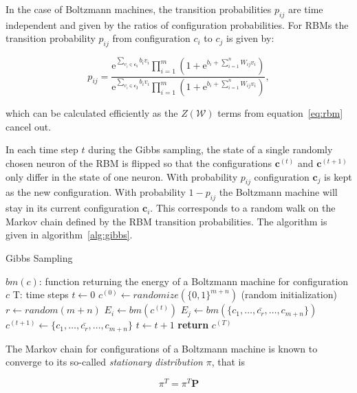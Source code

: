 In the case of Boltzmann machines, the transition probabilities $p_{ij}$ are time independent and 
given by the ratios of configuration probabilities. For RBMs the transition probability $p_{ij}$ 
from configuration $c_i$ to $c_j$ is given by:

\begin{equation}
    p_{ij} = \frac{\mathrm{e}^{\sum_{v_i \in \bm{c_i}}b_iv_i}\prod_{i=1}^m(1+\mathrm{e}^{b_i + \sum_{i=1}^nW_{ij}v_i})}{\mathrm{e}^{\sum_{v_i \in \bm{c_j}}b_iv_i}\prod_{i=1}^m(1+\mathrm{e}^{b_i + \sum_{i=1}^nW_{ij}v_i})},
\end{equation}

which can be calculated efficiently as the $Z(\mathcal{W})$ terms from equation~\ref{eq:rbm} cancel out.

In each time step $t$ during the Gibbs sampling, the state of a single randomly chosen neuron of the RBM is flipped
so that the configurations $\bm{c}^{(t)}$ and $\bm{c}^{(t+1)}$ only differ in the state of one neuron. With 
probability $p_{ij}$ configuration $\bm{c}_j$ is kept as the new configuration. With probability
$1-p_{ij}$ the Boltzmann machine will stay in its current configuration $\bm{c}_i$. This corresponds to a random walk on the Markov chain defined by the RBM transition probabilities. The algorithm is given in 
algorithm~\ref{alg:gibbs}.

\begin{algorithm}[H]
    \caption{Gibbs Sampling}
    \begin{algorithmic}[1]
        \Require $bm(c)$: function returning the energy of a Boltzmann machine for configuration $c$
        \Require T: time steps
        \State $t\gets 0$
        \State $c^{(0)} \gets randomize(\{0,1\}^{m+n})$ (random initialization)
        \Repeat
            \State $r \gets random(m+n)$
            \State $E_i \gets bm(c^{(t)})$
            \State $E_j \gets bm(\{c_1,\dots,\bar{c_r},\dots,c_{m+n}\})$
                \State $c^{(t+1)} \gets \{c_1,\dots,\bar{c_r},\dots,c_{m+n}\}$
            \EndIf
            \State $t\gets t+1$
        \State \textbf{return} $c^{(T)}$
    \end{algorithmic}
    \label{alg:gibbs}
\end{algorithm}

The Markov chain for configurations of a Boltzmann machine is known to converge to its so-called 
\textit{stationary distribution} $\pi$, that is

\begin{equation}
    \pi^T=\pi^T\bm{P}
\end{equation}

